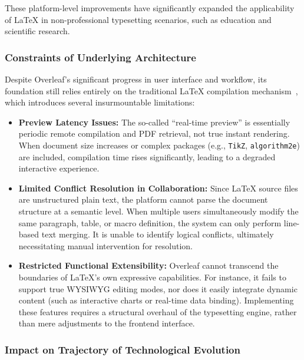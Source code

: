 These platform-level improvements have significantly expanded the applicability of \LaTeX{} in non-professional typesetting scenarios, such as education and scientific research.

\subsubsection{Constraints of Underlying Architecture}

Despite Overleaf's significant progress in user interface and workflow, its foundation still relies entirely on the traditional \LaTeX{} compilation mechanism~\cite{overleaf_docs}, which introduces several insurmountable limitations:

\begin{itemize}
    \item \textbf{Preview Latency Issues:} The so-called ``real-time preview'' is essentially periodic remote compilation and PDF retrieval, not true instant rendering. When document size increases or complex packages (e.g., \texttt{TikZ}, \texttt{algorithm2e}) are included, compilation time rises significantly, leading to a degraded interactive experience.

    \item \textbf{Limited Conflict Resolution in Collaboration:} Since \LaTeX{} source files are unstructured plain text, the platform cannot parse the document structure at a semantic level. When multiple users simultaneously modify the same paragraph, table, or macro definition, the system can only perform line-based text merging. It is unable to identify logical conflicts, ultimately necessitating manual intervention for resolution.

    \item \textbf{Restricted Functional Extensibility:} Overleaf cannot transcend the boundaries of \LaTeX{}'s own expressive capabilities. For instance, it fails to support true WYSIWYG editing modes, nor does it easily integrate dynamic content (such as interactive charts or real-time data binding). Implementing these features requires a structural overhaul of the typesetting engine, rather than mere adjustments to the frontend interface.
\end{itemize}

\subsubsection{Impact on Trajectory of Technological Evolution}

